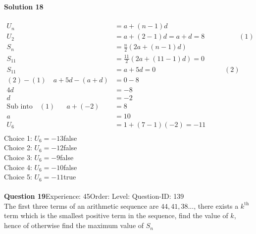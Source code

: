 \documentclass{article}
\begin{document}
\noindent\textbf{Solution 18}\\[2pt]
\\[-35pt]\begin{align*}
U_n&=a+(n-1)d\\[2pt]
U_2&=a+(2-1)d=a+d=8\hspace{59pt} (1)\\[2pt]
S_n&=\displaystyle\frac{n}{2}(2a+(n-1)d)\\[2pt]
S_{11}&=\displaystyle\frac{11}{2}(2a+(11-1)d)=0\\[2pt]
S_{11}&=a+5d=0\hspace{119pt} (2)\\[2pt]
(2)-(1)\quad a+5d-(a+d)&=0-8\\[2pt]
4d&=-8\\[2pt]
d&=-2\\[2pt]
\text{Sub into} \quad (1) \hspace{20pt} a+(-2)&=8\\[2pt]
a&=10\\[12pt]
U_{6}&=1+(7-1)(-2)=-11\\[2pt]
\end{align*}
Choice 1: \hspace{20pt}$U_{6}=-13$\hspace{20pt}false\\
Choice 2: \hspace{20pt}$U_{6}=-12$\hspace{20pt}false\\
Choice 3: \hspace{20pt}$U_{6}=-9$\hspace{20pt}false\\
Choice 4: \hspace{20pt}$U_{6}=-10$\hspace{20pt}false\\
Choice 5: \hspace{20pt}$U_{6}=-11$\hspace{20pt}true\\
\\[4pt]
\noindent\textbf{Question 19}\hspace{20pt}Experience: 45\hspace{20pt}Order: \hspace{20pt}Level: \hspace{20pt}Question-ID: 139\\[2pt]
The first three terms of an arithmetic sequence are $44,41,38...$, there exists a $k^{\text{th}}$ term which is the smallest positive term in the sequence, find the value of $k$, hence of otherwise find the maximum value of $S_n$\\[4pt]
\end{document}

